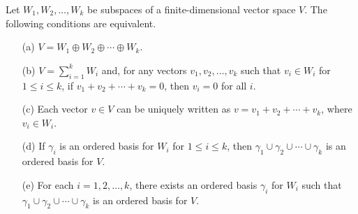 \begin{theorem}
    Let \( {W}_{1}, {W}_{2}, \dots, {W}_{k} \) be subspaces of a finite-dimensional vector space \( V  \). The following conditions are equivalent. 
    \begin{enumerate}
        \item[(a)] \( V = {W}_{1} \oplus {W}_{2} \oplus \cdots \oplus {W}_{k}  \).
        \item[(b)] \( V = \sum_{ i = 1  }^{ k  } {W}_{i}  \) and, for any vectors       \( {v}_{1}, {v}_{2}, \dots, {v}_{k } \) such that \( {v}_{i} \in {W}_{i} \) for \( 1 \leq i \leq k  \), if \( {v}_{1} + {v}_{2} + \cdots + {v}_{k } = 0  \), then \( {v}_{i} = 0  \) for all \( i \).
        \item[(c)] Each vector \( v \in V  \) can be uniquely written as \( v = {v}_{1} + {v}_{2} + \cdots + {v}_{k } \), where \( {v}_{i} \in {W}_{i} \).
        \item[(d)] If \( {\gamma}_{i} \) is an ordered basis for \( {W}_{i}  \) for \( 1 \leq i \leq k  \), then \( {\gamma}_{1} \cup {\gamma}_{2} \cup \cdots \cup {\gamma}_{k}  \) is an ordered basis for \( V  \).
        \item[(e)] For each \( i = 1, 2 , \dots, k  \), there exists an ordered basis \({\gamma}_{i} \) for \( {W}_{i} \) such that \( {\gamma}_{1} \cup {\gamma}_{2} \cup \cdots \cup {\gamma}_{k} \) is an ordered basis for \( V  \).
    \end{enumerate}
\end{theorem}
